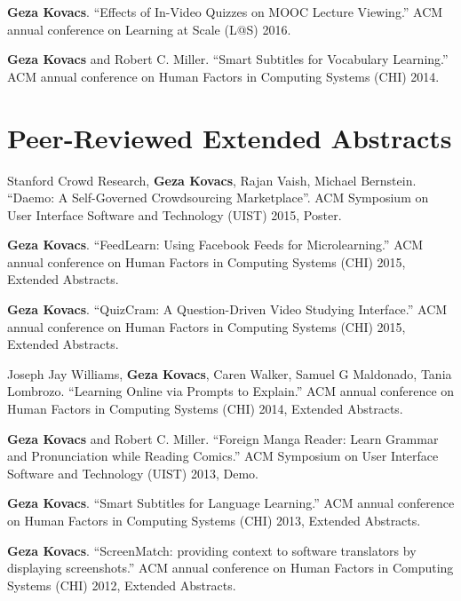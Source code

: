 \documentclass[margin,line]{resume}
\begin{document}
\begin{resume}
\textbf{Geza Kovacs}. ``Effects of In-Video Quizzes on MOOC Lecture Viewing.'' ACM annual conference on Learning at Scale (L@S) 2016. %

\textbf{Geza Kovacs} and Robert C. Miller. ``Smart Subtitles for Vocabulary Learning.'' ACM annual conference on Human Factors in Computing Systems (CHI) 2014. %


\section{\mysidestyle Peer-Reviewed Extended Abstracts}

Stanford Crowd Research, \textbf{Geza Kovacs}, Rajan Vaish, Michael Bernstein. ``Daemo: A Self-Governed Crowdsourcing Marketplace''. ACM Symposium on User Interface Software and Technology (UIST) 2015, Poster.

\textbf{Geza Kovacs}. ``FeedLearn: Using Facebook Feeds for Microlearning.'' ACM annual conference on Human Factors in Computing Systems (CHI) 2015, Extended Abstracts. %

\textbf{Geza Kovacs}. ``QuizCram: A Question-Driven Video Studying Interface.'' ACM annual conference on Human Factors in Computing Systems (CHI) 2015, Extended Abstracts.

Joseph Jay Williams, \textbf{Geza Kovacs}, Caren Walker, Samuel G Maldonado, Tania Lombrozo. ``Learning Online via Prompts to Explain.'' ACM annual conference on Human Factors in Computing Systems (CHI) 2014, Extended Abstracts.

\textbf{Geza Kovacs} and Robert C. Miller. ``Foreign Manga Reader: Learn Grammar and Pronunciation while Reading Comics.'' ACM Symposium on User Interface Software and Technology (UIST) 2013, Demo.

\textbf{Geza Kovacs}. ``Smart Subtitles for Language Learning.'' ACM annual conference on Human Factors in Computing Systems (CHI) 2013, Extended Abstracts.%

\textbf{Geza Kovacs}. ``ScreenMatch: providing context to software translators by displaying screenshots.'' ACM annual conference on Human Factors in Computing Systems (CHI) 2012, Extended Abstracts.%


\end{resume}
\end{document}
